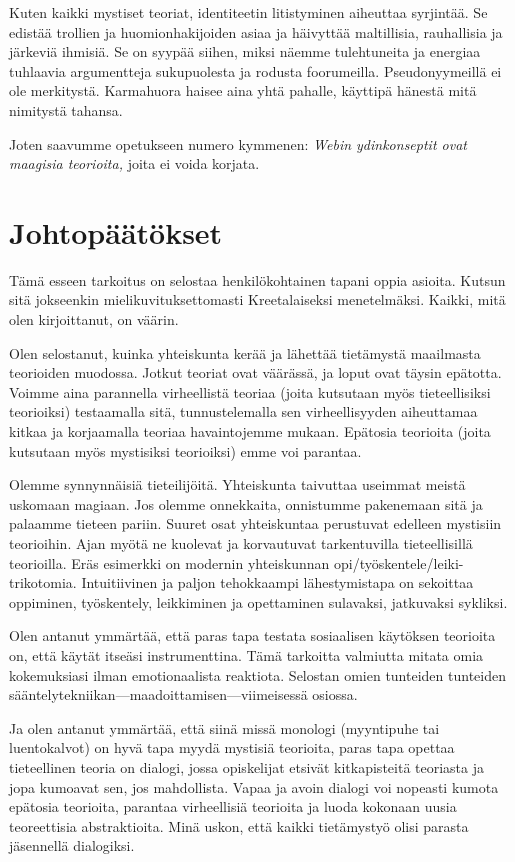 Kuten kaikki mystiset teoriat, identiteetin litistyminen aiheuttaa syrjintää. Se edistää trollien ja huomionhakijoiden asiaa ja häivyttää maltillisia, rauhallisia ja järkeviä ihmisiä. Se on syypää siihen, miksi näemme tulehtuneita ja energiaa tuhlaavia argumentteja sukupuolesta ja rodusta foorumeilla. Pseudonyymeillä ei ole merkitystä. Karmahuora haisee aina yhtä pahalle, käyttipä hänestä mitä nimitystä tahansa.

Joten saavumme opetukseen numero kymmenen: \emph{Webin ydinkonseptit ovat maagisia teorioita,} joita ei voida korjata.

\section{Johtopäätökset}

Tämä esseen tarkoitus on selostaa henkilökohtainen tapani oppia asioita. Kutsun sitä jokseenkin mielikuvituksettomasti Kreetalaiseksi menetelmäksi. Kaikki, mitä olen kirjoittanut, on väärin.

Olen selostanut, kuinka yhteiskunta kerää ja lähettää tietämystä maailmasta teorioiden muodossa. Jotkut teoriat ovat väärässä, ja loput ovat täysin epätotta. Voimme aina parannella virheellistä teoriaa (joita kutsutaan myös tieteellisiksi teorioiksi) testaamalla sitä, tunnustelemalla sen virheellisyyden aiheuttamaa kitkaa ja korjaamalla teoriaa havaintojemme mukaan. Epätosia teorioita (joita kutsutaan myös mystisiksi teorioiksi) emme voi parantaa.

Olemme synnynnäisiä tieteilijöitä. Yhteiskunta taivuttaa useimmat meistä uskomaan magiaan. Jos olemme onnekkaita, onnistumme pakenemaan sitä ja palaamme tieteen pariin. Suuret osat yhteiskuntaa perustuvat edelleen mystisiin teorioihin. Ajan myötä ne kuolevat ja korvautuvat tarkentuvilla tieteellisillä teorioilla. Eräs esimerkki on modernin yhteiskunnan opi/työskentele/leiki-trikotomia. Intuitiivinen ja paljon tehokkaampi lähestymistapa on sekoittaa oppiminen, työskentely, leikkiminen ja opettaminen sulavaksi, jatkuvaksi sykliksi.

Olen antanut ymmärtää, että paras tapa testata sosiaalisen käytöksen teorioita on, että käytät itseäsi instrumenttina. Tämä tarkoitta valmiutta mitata omia kokemuksiasi ilman emotionaalista reaktiota. Selostan omien tunteiden tunteiden sääntelytekniikan---maadoittamisen---viimeisessä osiossa.

Ja olen antanut ymmärtää, että siinä missä monologi (myyntipuhe tai luentokalvot) on hyvä tapa myydä mystisiä teorioita, paras tapa opettaa tieteellinen teoria on dialogi, jossa opiskelijat etsivät kitkapisteitä teoriasta ja jopa kumoavat sen, jos mahdollista. Vapaa ja avoin dialogi voi nopeasti kumota epätosia teorioita, parantaa virheellisiä teorioita ja luoda kokonaan uusia teoreettisia abstraktioita. Minä uskon, että kaikki tietämystyö olisi parasta jäsennellä dialogiksi.

